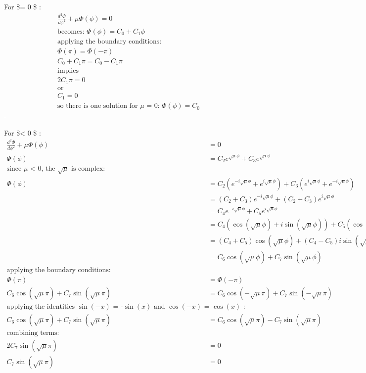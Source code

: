 \documentclass[11pt]{article}
\begin{document}
For \$\mu = 0 \$ : \begin{equation}
\begin{split}
\frac{d^2 \Phi}{d \phi^2} + \mu \Phi(\phi) = 0 \\
\text{becomes:  } \Phi(\phi) = C_0 + C_1 \phi \\
\text{applying the boundary conditions:  } \\ 
\Phi(\pi) = \Phi(- \pi) \\
C_0 + C_1 \pi = C_0 - C_1 \pi \\
\text{implies } \\
2  C_1 \pi = 0 \\
\text{or } \\
C_1 = 0 \\ 
\text{so there is one solution for $\mu$ = 0: }
\Phi(\phi) = C_0 
\end{split}
\end{equation}-

For \$\mu \textless{} 0 \$ : \begin{equation}
\begin{split}
\frac{d^2 \Phi}{d \phi^2} + \mu \Phi(\phi) &= 0 \\
\Phi(\phi) &= C_2 e^{\sqrt{\mu}\phi} + C_3 e^{\sqrt{\mu}\phi} \\
\text{since $\mu$ < 0, the $\sqrt{\mu}$ is complex:  } \\
\Phi(\phi) &= C_2 (e^{-i \sqrt{\mu}\phi} + e^{i \sqrt{\mu}\phi}) + C_3 (e^{i \sqrt{\mu}\phi} + e^{-i \sqrt{\mu}\phi}) \\
 &= (C_2 + C_3)e^{-i \sqrt{\mu}\phi} +(C_2 + C_3) e^{i \sqrt{\mu}\phi} \\
 &= C_4 e^{-i \sqrt{\mu}\phi} + C_5 e^{i \sqrt{\mu}\phi} \\
 &= C_4 (\cos(\sqrt{\mu}\phi) + i \sin(\sqrt{\mu}\phi)) + C_5 (\cos(\sqrt{\mu}\phi) + i \sin(-\sqrt{\mu}\phi))  \\
 &= (C_4 + C_5) \cos(\sqrt{\mu}\phi) + (C_4 - C_5) i \sin(\sqrt{\mu}\phi) \\
 &= C_6 \cos(\sqrt{\mu}\phi) + C_7 \sin(\sqrt{\mu}\phi) \\
\text{applying the boundary conditions:  } \\
\Phi(\pi) &= \Phi(- \pi) \\
C_6 \cos(\sqrt{\mu}\pi) + C_7 \sin(\sqrt{\mu}\pi) &= C_6 \cos(-\sqrt{\mu}\pi) + C_7 \sin(-\sqrt{\mu}\pi)  \\
\text{applying the identities $\sin(-x)$ = -$\sin(x)$ and $\cos(-x)$ = $\cos(x)$ :  } \\
C_6 \cos(\sqrt{\mu}\pi) + C_7 \sin(\sqrt{\mu}\pi) &= C_6 \cos(\sqrt{\mu}\pi) - C_7 \sin(\sqrt{\mu}\pi)  \\
\text{combining terms:  } \\
2 C_7 \sin(\sqrt{\mu}\pi) &= 0  \\
C_7 \sin(\sqrt{\mu}\pi) &= 0 
\end{split}
\end{equation}
\end{document}
